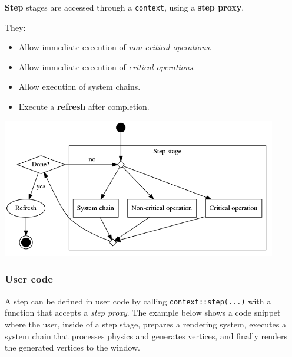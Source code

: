 \documentclass[twoside, 12pt, a4paper, openany]{book}
\let\origfigure=\figure
\let\endorigfigure=\endfigure
\renewenvironment{figure}[1][]{%
\origfigure[H]
}{%
\endorigfigure
}
\begin{document}
\textbf{Step} stages are accessed through a
\texttt{context},
using a \textbf{step proxy}.

They:

\begin{itemize}
\item
  Allow immediate execution of \emph{non-critical operations}.
\item
  Allow immediate execution of \emph{critical operations}.
\item
  Allow execution of system chains.
\item
  Execute a \textbf{refresh} after completion.
\end{itemize}

\begin{figure}[htbp]
\centering
\includegraphics[width=0.90000\textwidth]{source/figures/generated/ecst/flow/stepact.png}
\caption{ECST flow: ``step'' stage overview}
\end{figure}

\subsubsection{User code}\label{user-code}

A step can be defined in user code by calling
\texttt{context::step(...)}
with a function that accepts a \emph{step proxy}. The example below
shows a code snippet where the user, inside of a step stage, prepares a
rendering system, executes a system chain that processes physics and
generates vertices, and finally renders the generated vertices to the
window.
\end{document}
